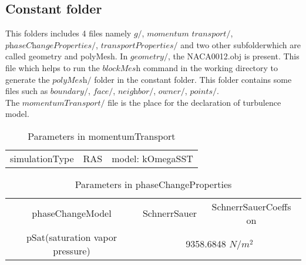 \subsection{Constant folder}
This folders includes 4 files namely $\textit{g}/$, $\textit{momentum transport}/$, 
$\textit{phaseChangeProperties}/$, $\textit{transportProperties}/$ and two other subfolderwhich are called  geometry 
and polyMesh. In $\textit{geometry}/$, the NACA0012.obj is present. This file which helps to run the
$\textit{blockMesh}$ command in the working directory to generate the $\textit{polyMesh}/$ folder in the 
constant folder. This folder contains some files such as $\textit{boundary}/$, $\textit{face}/$, $\textit{neighbor}/$, 
$\textit{owner}/$, $\textit{points}/$.\\The $\textit{momentumTransport/}$ file is the place for the declaration 
of turbulence model.
\begin{table}[h]
\centering
\begin{tabular}{|lll|}
\hline
\rowcolor{gray!20}\multicolumn{3}{|l|}{momentumTransport}                            \\ \hline
\multicolumn{1}{|l|}{simulationType } & \multicolumn{1}{l|}{RAS} & model:          kOmegaSST \\ \hline
\end{tabular}
\caption{Parameters in momentumTransport}
\label{tab:PC}
\end{table}








\begin{table}[h]
\centering
\begin{tabular}{|ccc|}
\hline
\rowcolor{gray!20}\multicolumn{3}{|c|}{PhaseChangeProperties}                            \\ \hline
\multicolumn{1}{|c|}{phaseChangeModel} & \multicolumn{1}{c|}{SchnerrSauer} & SchnerrSauerCoeffs on \\ \hline
\multicolumn{1}{|c|}{pSat(saturation vapor pressure)} & \multicolumn{2}{c|}{9358.6848 $N/{m^2}$}    \\ \hline
\end{tabular}
\caption{Parameters in phaseChangeProperties}
\label{tab:PC}
\end{table}







